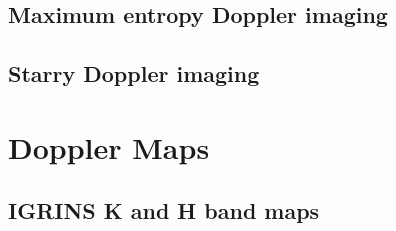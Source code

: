 \documentclass[twocolumn]{aastex631}
\begin{document}
\subsection{Maximum entropy Doppler imaging}

\subsection{Starry Doppler imaging}


\section{Doppler Maps}

\subsection{IGRINS K and H band maps}

\iffalse
\begin{figure*}
    \script{run_igrinsK.py}
    \centering
    \begin{minipage}[b]{0.18\textwidth}
        \centering
        \texttt{[image: figures/igrinsK/solver1.pdf]}
        \label{fig:igrinsKsolver1}
     \end{minipage}
     \hfill
     \begin{minipage}[b]{0.18\textwidth}
         \centering
         \texttt{[image: figures/igrinsK/solver2.pdf]}
         \label{fig:igrinsKsolver2}
     \end{minipage}
     \hfill
     \begin{minipage}[b]{0.18\textwidth}
         \centering
         \texttt{[image: figures/igrinsK/solver3.pdf]}
         \label{fig:igrinsKsolver3}
     \end{minipage}
     \hfill
     \begin{minipage}[b]{0.18\textwidth}
         \centering
         \texttt{[image: figures/igrinsK/solver4.pdf]}
         \label{fig:igrinsKsolver4}
     \end{minipage}
     \hfill
     \begin{minipage}[b]{0.18\textwidth}
         \centering
         \texttt{[image: figures/igrinsK/solver5.pdf]}
         \label{fig:igrinsKsolver5}
     \end{minipage}
\end{figure*}
\fi
\end{document}
